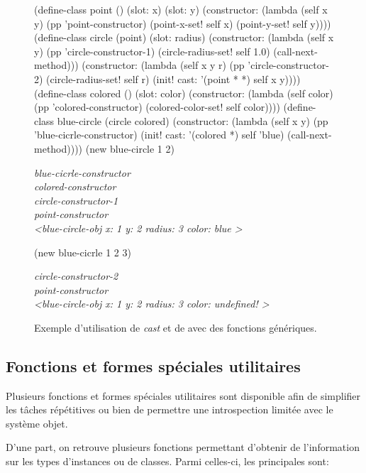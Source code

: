 \documentclass[12pt,oneside,letterpaper,francais]{book}
\newcommand{\scheme}[1]{\selectlanguage{english}{\tt #1}\selectlanguage{french}}
\begin{document}
\begin{figure}[p!]
  \begin{schemecode}
(define-class point () (slot: x) (slot: y)
  (constructor: (lambda (self x y)
                  (pp 'point-constructor)
                  (point-x-set! self x) (point-y-set! self y))))
(define-class circle (point) (slot: radius)
  (constructor: (lambda (self x y)
                  (pp 'circle-constructor-1)
                  (circle-radius-set! self 1.0)
                  (call-next-method)))
  (constructor: (lambda (self x y r)
                  (pp 'circle-constructor-2)
                  (circle-radius-set! self r)
                  (init! cast: '(point * *) self x y))))
(define-class colored () (slot: color)
  (constructor: (lambda (self color)
                  (pp 'colored-constructor)
                  (colored-color-set! self color))))
(define-class blue-circle (circle colored)
  (constructor: (lambda (self x y)
                  (pp 'blue-cicrle-constructor)
                  (init! cast: '(colored *) self 'blue)
                  (call-next-method))))
(new blue-circle 1 2)
  \end{schemecode}
  {{\it
blue-cicrle-constructor\\
colored-constructor\\
circle-constructor-1\\
point-constructor\\
\textless blue-circle-obj x: 1 y: 2 radius: 3 color: blue \textgreater 
  }}
  \begin{schemecode}
    (new blue-cicrle 1 2 3)
  \end{schemecode}
  {{\it
circle-constructor-2\\
point-constructor\\
\textless blue-circle-obj x: 1 y: 2 radius: 3 color: undefined!  \textgreater
  }}
  \caption{Exemple d'utilisation de \textit{cast} et de
    \scheme{call-next-method} avec des fonctions génériques.}
  \label{OO:cast}
\end{figure}


\subsection{Fonctions et formes spéciales utilitaires}

Plusieurs fonctions et formes spéciales utilitaires sont disponible
afin de simplifier les tâches répétitives ou bien de permettre une
introspection limitée avec le système objet.

D'une part, on retrouve plusieurs fonctions permettant d'obtenir de
l'information sur les types d'instances ou de classes. Parmi
celles-ci, les principales sont:
\end{document}
